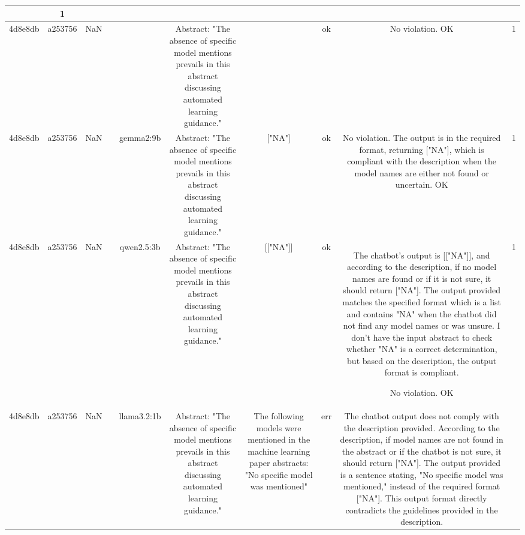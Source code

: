 \begin{table}[h!]
\begin{tabular}{|c|c|c|c|c|c|c|c|c|c|}
\[\[\[\[\[2. **Format Compliance**: The output is formatted as an array of strings, which complies with the stipulated output format. 

3. **Model Name Specification**: Without knowing the input abstract, it is not possible to determine if "Fuzzy Logic" appears as a model name in the text or if the chatbot is uncertain and should have returned ["NA"]. Hence, we cannot evaluate this part for compliance.

4. **Assumption of Compliance**: Since we are to assume compliance where the description is ambiguous or does not specify otherwise (like repeated entries), unless explicitly stated that duplicates are not allowed, it is difficult to claim a direct violation on that basis alone.

Taking into account that we cannot ascertain the correctness related to the input and that the format is compliant, while assuming that duplicates, unless specified otherwise, do not necessarily imply a violation, the output appears to be within the given directives as per the evaluation guidelines specified.

No violation.
OK & 1\\
\hline
4d8e8db & a253756 & NaN &  &  & Abstract: "The absence of specific model mentions prevails in this abstract discussing automated learning guidance." &  & ok & No violation.
OK & 1\\
\hline
4d8e8db & a253756 & NaN &  & gemma2:9b & Abstract: "The absence of specific model mentions prevails in this abstract discussing automated learning guidance." & ["NA"] 
 & ok & No violation. The output is in the required format, returning ["NA"], which is compliant with the description when the model names are either not found or uncertain. 
OK & 1\\
\hline
4d8e8db & a253756 & NaN &  & qwen2.5:3b & Abstract: "The absence of specific model mentions prevails in this abstract discussing automated learning guidance." & [["NA"]] & ok & The chatbot's output is [["NA"]], and according to the description, if no model names are found or if it is not sure, it should return ["NA"]. The output provided matches the specified format which is a list and contains "NA" when the chatbot did not find any model names or was unsure. I don't have the input abstract to check whether "NA" is a correct determination, but based on the description, the output format is compliant.

No violation.
OK & 1\\
\hline
4d8e8db & a253756 & NaN &  & llama3.2:1b & Abstract: "The absence of specific model mentions prevails in this abstract discussing automated learning guidance." & The following models were mentioned in the machine learning paper abstracts:
"No specific model was mentioned" & err & The chatbot output does not comply with the description provided. According to the description, if model names are not found in the abstract or if the chatbot is not sure, it should return ["NA"]. The output provided is a sentence stating, "No specific model was mentioned," instead of the required format ["NA"]. This output format directly contradicts the guidelines provided in the description.

\]\]\]\]\]
\end{tabular}
\end{table}
